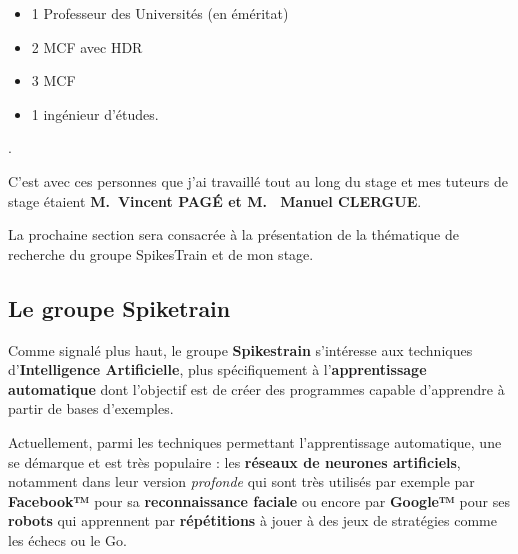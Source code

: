 \begin{itemize}
\tightlist
\item
  1 Professeur des Universités (en éméritat)
\item
  2 MCF avec HDR
\item
  3 MCF
\item
  1 ingénieur d'études.
\end{itemize}.

C'est avec ces personnes que j'ai travaillé tout au long du stage et mes
tuteurs de stage étaient \textbf{M.~Vincent PAGÉ et M. ~Manuel CLERGUE}.

%

La prochaine section sera consacrée à la présentation de la thématique
de recherche du groupe SpikesTrain et de mon stage.

\hypertarget{Objectif_Spike}{%
\subsection{Le groupe Spiketrain}\label{Groupe_Spiketrain}}

Comme signalé plus haut, le groupe \textbf{Spikestrain} s'intéresse aux
techniques d'\textbf{Intelligence Artificielle}, plus spécifiquement à
l'\textbf{apprentissage automatique} dont l'objectif est de créer des
programmes capable d'apprendre à partir de bases d'exemples.

Actuellement, parmi les techniques permettant l'apprentissage
automatique, une se démarque et est très populaire : les
\textbf{réseaux de neurones artificiels}, notamment dans leur version
\emph{profonde} qui sont très utilisés par exemple par \textbf{Facebook™}
pour sa \textbf{reconnaissance faciale} ou encore par \textbf{Google™}
pour ses \textbf{robots} qui apprennent par \textbf{répétitions} à jouer
à des jeux de stratégies comme les échecs ou le Go.


